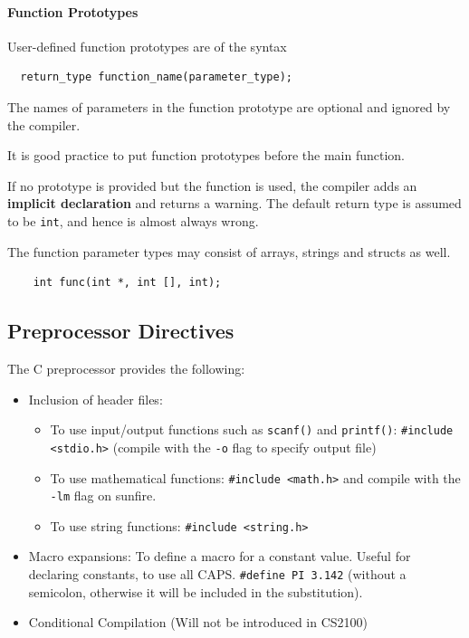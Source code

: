 \paragraph{Function Prototypes}
User-defined function prototypes are of the syntax
\begin{lstlisting}
  return_type function_name(parameter_type);
\end{lstlisting}
The names of parameters in the function prototype are optional and ignored by
the compiler.
\begin{remark}
 It is good practice to put function prototypes before the main function. 
\end{remark}
If no prototype is provided but the function is used, the compiler adds an
\textbf{implicit declaration} and returns a warning. The default return type is
assumed to be \verb|int|, and hence is almost always wrong.
\begin{example}
  The function parameter types may consist of arrays, strings and structs as well.
  \begin{lstlisting}
    int func(int *, int [], int);
  \end{lstlisting}
\end{example}

\subsection{Preprocessor Directives}
The C preprocessor provides the following:
\begin{itemize}
  \item Inclusion of header files:
    \begin{itemize}
      \item To use input/output functions such as \verb|scanf()| and
        \verb|printf()|: \verb|#include <stdio.h>| (compile with the \verb|-o|
        flag to specify output file)
      \item To use mathematical functions: \verb|#include <math.h>| and compile
        with the \verb|-lm| flag on sunfire.
      \item To use string functions: \verb|#include <string.h>|
    \end{itemize}
  \item Macro expansions:
    To define a macro for a constant value. Useful for declaring constants, to
    use all CAPS. \verb|#define PI 3.142| (without a semicolon, otherwise it
    will be included in the substitution).
  \item Conditional Compilation (Will not be introduced in CS2100)
\end{itemize}
